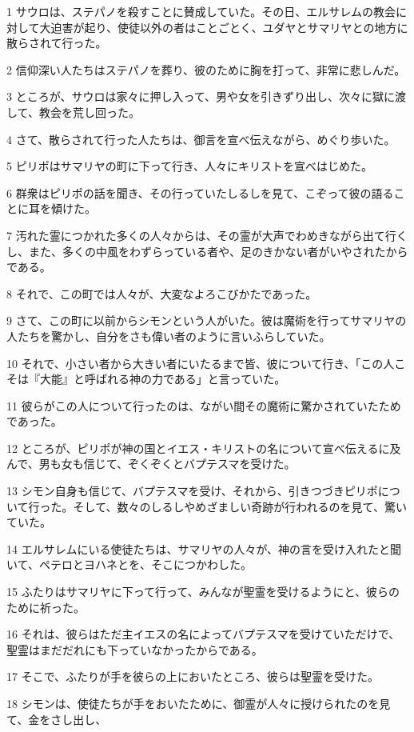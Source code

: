 \par 1 サウロは、ステパノを殺すことに賛成していた。その日、エルサレムの教会に対して大迫害が起り、使徒以外の者はことごとく、ユダヤとサマリヤとの地方に散らされて行った。
\par 2 信仰深い人たちはステパノを葬り、彼のために胸を打って、非常に悲しんだ。
\par 3 ところが、サウロは家々に押し入って、男や女を引きずり出し、次々に獄に渡して、教会を荒し回った。
\par 4 さて、散らされて行った人たちは、御言を宣べ伝えながら、めぐり歩いた。
\par 5 ピリポはサマリヤの町に下って行き、人々にキリストを宣べはじめた。
\par 6 群衆はピリポの話を聞き、その行っていたしるしを見て、こぞって彼の語ることに耳を傾けた。
\par 7 汚れた霊につかれた多くの人々からは、その霊が大声でわめきながら出て行くし、また、多くの中風をわずらっている者や、足のきかない者がいやされたからである。
\par 8 それで、この町では人々が、大変なよろこびかたであった。
\par 9 さて、この町に以前からシモンという人がいた。彼は魔術を行ってサマリヤの人たちを驚かし、自分をさも偉い者のように言いふらしていた。
\par 10 それで、小さい者から大きい者にいたるまで皆、彼について行き、「この人こそは『大能』と呼ばれる神の力である」と言っていた。
\par 11 彼らがこの人について行ったのは、ながい間その魔術に驚かされていたためであった。
\par 12 ところが、ピリポが神の国とイエス・キリストの名について宣べ伝えるに及んで、男も女も信じて、ぞくぞくとバプテスマを受けた。
\par 13 シモン自身も信じて、バプテスマを受け、それから、引きつづきピリポについて行った。そして、数々のしるしやめざましい奇跡が行われるのを見て、驚いていた。
\par 14 エルサレムにいる使徒たちは、サマリヤの人々が、神の言を受け入れたと聞いて、ペテロとヨハネとを、そこにつかわした。
\par 15 ふたりはサマリヤに下って行って、みんなが聖霊を受けるようにと、彼らのために祈った。
\par 16 それは、彼らはただ主イエスの名によってバプテスマを受けていただけで、聖霊はまだだれにも下っていなかったからである。
\par 17 そこで、ふたりが手を彼らの上においたところ、彼らは聖霊を受けた。
\par 18 シモンは、使徒たちが手をおいたために、御霊が人々に授けられたのを見て、金をさし出し、
